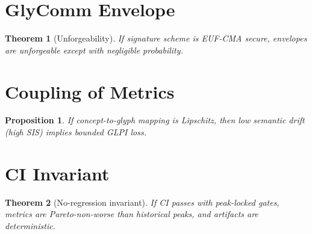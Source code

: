\documentclass[12pt]{article}
\newtheorem{theorem}{Theorem}
\newtheorem{proposition}{Proposition}
\begin{document}
\section{GlyComm Envelope}
\begin{theorem}[Unforgeability]
If signature scheme is EUF-CMA secure, envelopes are unforgeable except with negligible probability.
\end{theorem}

\section{Coupling of Metrics}
\begin{proposition}
If concept-to-glyph mapping is Lipschitz, then low semantic drift (high SIS) implies bounded GLPI loss.
\end{proposition}

\section{CI Invariant}
\begin{theorem}[No-regression invariant]
If CI passes with peak-locked gates, metrics are Pareto-non-worse than historical peaks, and artifacts are deterministic.
\end{theorem}
\end{document}
